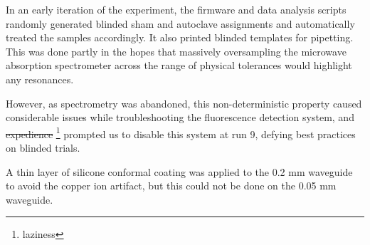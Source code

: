 \documentclass[paper.tex]{subfiles}
\begin{document}
In an early iteration of the experiment, the firmware and data analysis scripts randomly generated blinded sham and autoclave assignments and automatically treated the samples accordingly. It also printed blinded templates for pipetting. This was done partly in the hopes that massively oversampling the microwave absorption spectrometer across the range of physical tolerances would highlight any resonances.\cite{first2000} 

However, as spectrometry was abandoned, this non-deterministic property caused considerable issues while troubleshooting the fluorescence detection system, and \st{expedience} \footnote{laziness} prompted us to disable this system at run 9, defying best practices on blinded trials.

A thin layer of silicone conformal coating was applied to the 0.2 mm waveguide to avoid the copper ion artifact, but this could not be done on the 0.05 mm waveguide.

\clearpage
\end{document}
